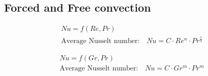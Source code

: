 \subsection{Forced and Free convection}
    \begin{minipage}{0.49\linewidth}
        \vspace*{-2em}
        \begin{align*}
            Nu = f(Re, Pr)\\
            \text{Average Nusselt number:} \quad Nu = C \cdot Re^n \cdot Pr^{\frac{1}{3}}
        \end{align*}
    \end{minipage}
    \begin{minipage}{0.49\linewidth}
        \vspace*{-2em}
        \begin{align*}
            Nu = f(Gr, Pr)\\
            \text{Average Nusselt number:} \quad Nu = C \cdot Gr^m \cdot Pr^m
        \end{align*}
    \end{minipage}